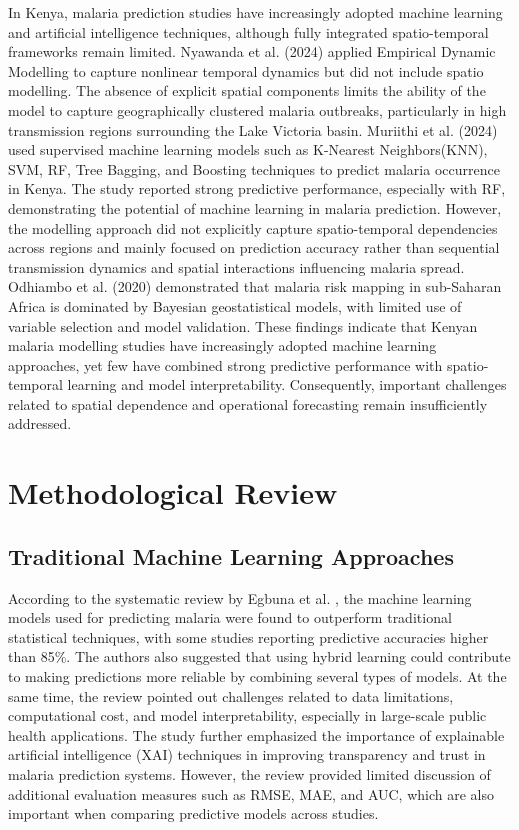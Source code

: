 In Kenya, malaria prediction studies have increasingly adopted machine learning and artificial intelligence techniques, although fully integrated spatio-temporal frameworks remain limited. Nyawanda et al. (2024) \cite{Nyawanda2024Forecasting} applied Empirical Dynamic Modelling to capture nonlinear temporal dynamics but did not include spatio modelling. The absence of explicit spatial components limits the ability of the model to capture geographically clustered malaria outbreaks, particularly in high transmission regions surrounding the Lake Victoria basin. Muriithi et al. (2024) \cite{Muriithi2024A} used supervised machine learning models such as K-Nearest Neighbors(KNN), SVM, RF, Tree Bagging, and Boosting techniques to predict malaria occurrence in Kenya. The study reported strong predictive performance, especially with RF, demonstrating the potential of machine learning in malaria prediction. However, the modelling approach did not explicitly capture spatio-temporal dependencies across regions and mainly focused on prediction accuracy rather than sequential transmission dynamics and spatial interactions influencing malaria spread. Odhiambo et al. (2020)\cite{Odhiambo2020} demonstrated that malaria risk mapping in sub-Saharan Africa is dominated by Bayesian geostatistical models, with limited use of variable selection and model validation. These findings indicate that Kenyan malaria modelling studies have increasingly adopted machine learning approaches, yet few have combined strong predictive performance with spatio-temporal learning and model interpretability. Consequently, important challenges related to spatial dependence and operational forecasting remain insufficiently addressed.

\section{Methodological Review}
\subsection{Traditional Machine Learning Approaches}

According to the systematic review by Egbuna et al. \cite{Egbuna2025}, the machine learning models used for predicting malaria were found to outperform traditional statistical techniques, with some studies reporting predictive accuracies higher than 85\%. The authors also suggested that using hybrid learning could contribute to making predictions more reliable by combining several types of models. At the same time, the review pointed out challenges related to data limitations, computational cost, and model interpretability, especially in large-scale public health applications. The study further emphasized the importance of explainable artificial intelligence (XAI) techniques in improving transparency and trust in malaria prediction systems. However, the review provided limited discussion of additional evaluation measures such as RMSE, MAE, and AUC, which are also important when comparing predictive models across studies.

